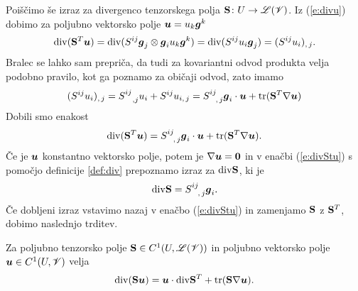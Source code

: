 Poiščimo še izraz za divergenco tenzorskega polja $\mathbf S\colon U\to\mathscr L(\mathscr V)$.
Iz (\ref{e:divu}) dobimo za poljubno vektorsko polje $\boldsymbol u=u_k\boldsymbol g^k$
\[
	\mathrm{div}(\mathbf S^{T}\boldsymbol u)=\mathrm{div}(S^{ij}\boldsymbol g_j\otimes\boldsymbol g_i u_k\boldsymbol g^k)
	=\mathrm{div}(S^{ij}u_i\boldsymbol g_j)=(S^{ij}u_i)_{,\,j}.
\]
Bralec se lahko sam prepriča, da tudi za kovariantni odvod produkta velja
podobno pravilo, kot ga poznamo za običaji odvod, zato imamo
\[
	(S^{ij}u_i)_{,\,j}=\topbot{S}{ij}{\,,j}u_i+S^{ij}u_{i,\,j}=
	\topbot{S}{ij}{,\,j}\vek{g}_i\cdot\vek{u}+\tr(\ten{S}^{T}\nabla\vek{u})
\]
Dobili smo enakost
\begin{equation} \label{e:divStu}
	\div(\ten{S}^{T}\vek{u})=\topbot{S}{ij}{,\,j}\vek{g}_i\cdot\vek{u}+\tr(\ten{S}^{T}\nabla\vek{u}).
\end{equation}
Če je $\boldsymbol u$ konstantno vektorsko polje, potem je $\nabla\boldsymbol u=\mathbf 0$ in v
enačbi (\ref{e:divStu}) s pomočjo definicije \ref{def:div} prepoznamo izraz za $\mathrm{div}\mathbf S$, ki je
\[
	\div\ten{S}=\topbot{S}{ij}{,\,j}\vek{g}_i.
\]
Če dobljeni izraz vstavimo nazaj v enačbo (\ref{e:divStu}) in zamenjamo $\mathbf S$ z
$\mathbf S^{T}$, dobimo naslednjo trditev.
\begin{trditev} \label{e:divSu}
	Za poljubno tenzorsko polje $\mathbf S\in C^1(U,\mathscr L(\mathscr V))$ in poljubno
	vektorsko polje $\boldsymbol u\in C^1(U,\mathscr V)$ velja
	\[ \mathrm{div}(\mathbf S\boldsymbol u)=\boldsymbol u\cdot\mathrm{div}\mathbf S^{T}+\mathrm{tr}(\mathbf S\nabla\boldsymbol u). \]
\end{trditev}